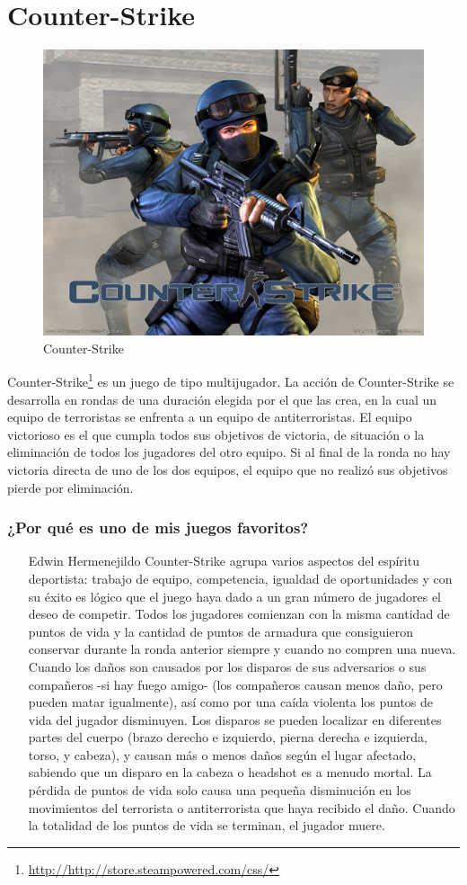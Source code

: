 \section{Counter-Strike}

\begin{figure}[htbp]
\begin{center}
\includegraphics[width=.60\textwidth]{./imagenes/CounterStrike.jpg}
\caption{Counter-Strike}
\label{Counter-Strike}
\end{center}
\end{figure}
Counter-Strike\footnote{\url{http://http://store.steampowered.com/css/}} es un juego de tipo multijugador. La acción de Counter-Strike se desarrolla en rondas de una duración elegida por el que las crea, en la cual un equipo de terroristas se enfrenta a un equipo de antiterroristas. El equipo victorioso es el que cumpla todos sus objetivos de victoria, de situación o la eliminación de todos los jugadores del otro equipo. Si al final de la ronda no hay victoria directa de uno de los dos equipos, el equipo que no realizó sus objetivos pierde por eliminación.

\subsubsection{¿Por qué es uno de mis juegos favoritos?}
\begin{itemize}
\item[Edwin Hermenejildo] Counter-Strike agrupa varios aspectos del espíritu deportista: trabajo de equipo, competencia, igualdad de oportunidades y con su éxito es lógico que el juego haya dado a un gran número de jugadores el deseo de competir.
Todos los jugadores comienzan con la misma cantidad de puntos de vida y la cantidad de puntos de armadura que consiguieron conservar durante la ronda anterior siempre y cuando no compren una nueva. Cuando los daños son causados por los disparos de sus adversarios o sus compañeros -si hay fuego amigo- (los compañeros causan menos daño, pero pueden matar igualmente), así como por una caída violenta los puntos de vida del jugador disminuyen. Los disparos se pueden localizar en diferentes partes del cuerpo (brazo derecho e izquierdo, pierna derecha e izquierda, torso, y cabeza), y causan más o menos daños según el lugar afectado, sabiendo que un disparo en la cabeza o headshot es a menudo mortal. La pérdida de puntos de vida solo causa una pequeña disminución en los movimientos del terrorista o antiterrorista que haya recibido el daño. Cuando la totalidad de los puntos de vida se terminan, el jugador muere.
\end{itemize}
